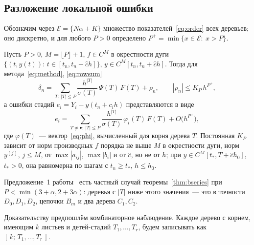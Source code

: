 \subsection{Разложение локальной ошибки}

Обозначим через $\mathcal E=\{N\alpha+K\}$ множество показателей~\eqref{eq:order} всех деревьев; оно дискретно, и для любого $P>0$ определено $P^{+}=\min\{x\in\mathcal E:\ x>P\}$.

\begin{theorem}\label{thm:bseries}
Пусть $P>0$, $M=\lfloor P\rfloor+1$, $f\in C^{M}$ в окрестности дуги $\{(t,y(t)):\,t\in[t_n,t_n+\hat ch]\}$, $y\in C^{M}[t_n,t_n+\hat ch]$. Тогда для метода~\eqref{eq:method}, \eqref{eq:rowsum}
\begin{equation}\label{eq:bseries}
\delta_n=\sum_{T:\ |T|\le P}\frac{h^{|T|}}{\sigma(T)}\,\Psi(T)\,F(T)+\rho_n,\qquad |\rho_n|\le K_P\,h^{P^{+}},
\end{equation}
а ошибки стадий $e_i=Y_i-y(t_n+c_ih)$ представляются в виде
\begin{equation}\label{eq:stage-series}
e_i=\sum_{T\ne\bullet:\ |T|\le P}\frac{h^{|T|}}{\sigma(T)}\,\varphi_i(T)\,F(T)+O\bigl(h^{P^{+}}\bigr),
\end{equation}
где $\varphi(T)$~--- вектор~\eqref{eq:phi}, вычисленный для корня дерева $T$. Постоянная $K_P$ зависит от норм производных $f$ порядка не выше $M$ в окрестности дуги, норм $y^{(j)}$, $j\le M$, от $\max|a_{ij}|$, $\max|b_i|$ и от $\hat c$, но не от $h$; при $y\in C^{M}[t_*,T+\hat ch_0]$, $t_*>0$, она равномерна по шагам с $t_n\ge t_*$, $h\le h_0$.
\end{theorem}

Предложение~1 работы~\cite{PrikBarriers} есть частный случай теоремы~\ref{thm:bseries} при $P<\min(3+\alpha,2+3\alpha)$: деревья с $|T|$ ниже этого значения~--- это в точности $D_0,D_1,D_2$, цепочки $B_m$ и два дерева $C_1,C_2$.

Доказательству предпошлём комбинаторное наблюдение. Каждое дерево с корнем, имеющим $k$ листьев и детей-стадий $T_1,\dots,T_r$, будем записывать как $[\,k;\,T_1,\dots,T_r\,]$.

